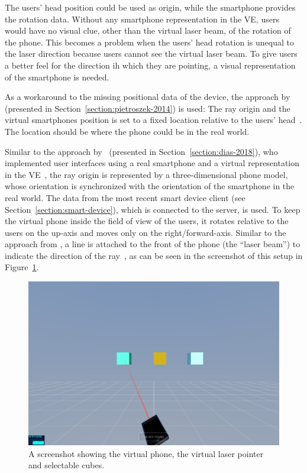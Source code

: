 The users' head position could be used as origin, while the smartphone provides the rotation data. Without any smartphone representation in the \gls{VE}, users would have no visual clue, other than the virtual laser beam, of the rotation of the phone. This becomes a problem when the users' head rotation is unequal to the laser direction because users cannot see the virtual laser beam. To give users a better feel for the direction ih which they are pointing, a visual representation of the smartphone is needed.

As a workaround to the missing positional data of the device, the approach by \citeauthor{Pietroszek.2014} (presented in Section~\ref{section:pietroszek-2014}) is used: The ray origin and the virtual smartphones position is set to a fixed location relative to the users' head~\cite[Figure 3]{Pietroszek.2014}. The location should be where the phone could be in the real world.

Similar to the approach by~\citeauthor{Dias.2018} (presented in Section~\ref{section:dias-2018}), who implemented user interfaces using a real smartphone and a virtual representation in the \gls{VE}~\cite[5]{Dias.2018}, the ray origin is represented by a three-dimensional phone model, whose orientation is synchronized with the orientation of the smartphone in the real world. The data from the most recent smart device client (see Section~\ref{section:smart-device}), which is connected to the server, is used. To keep the virtual phone inside the field of view of the users, it rotates relative to the users on the up-axis and moves only on the right/forward-axis.
Similar to the approach from \citeauthor{Steed.2013}, a line is attached to the front of the phone (the \enquote{laser beam}) to indicate the direction of the ray~\cite[46]{Steed.2013}, as can be seen in the screenshot of this setup in Figure~\ref{fig:screenshot-exp-lp}.

\begin{figure}[H]
	\centering
	\includegraphics[width=12cm]{figures/implementation/screenshot_exp_lp.png}
	\caption[Screenshot of the laser pointer]{A screenshot showing the virtual phone, the virtual laser pointer and selectable cubes.}\label{fig:screenshot-exp-lp}
\end{figure}

